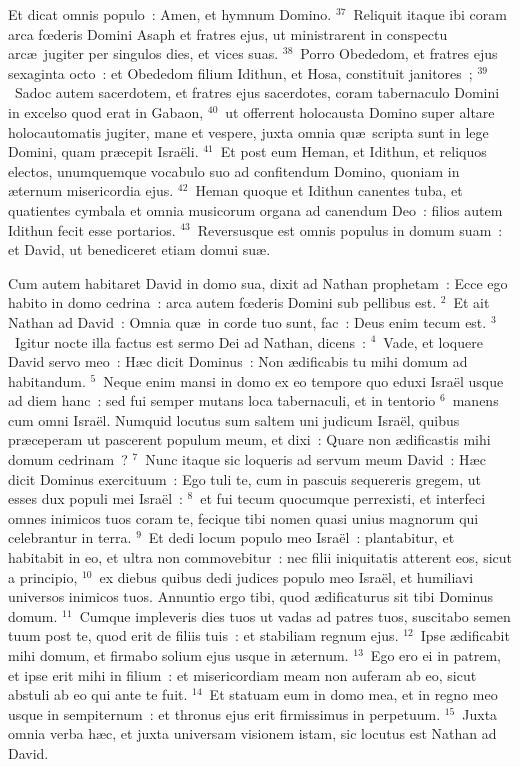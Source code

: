  Et dicat omnis populo~: Amen, et hymnum Domino.
${}^{37}$~Reliquit itaque ibi coram arca fœderis Domini Asaph et fratres ejus, ut ministrarent in conspectu arc\ae\ jugiter per singulos dies, et vices suas.
${}^{38}$~Porro Obededom, et fratres ejus sexaginta octo~: et Obededom filium Idithun, et Hosa, constituit janitores~;
${}^{39}$~Sadoc autem sacerdotem, et fratres ejus sacerdotes, coram tabernaculo Domini in excelso quod erat in Gabaon,
${}^{40}$~ut offerrent holocausta Domino super altare holocautomatis jugiter, mane et vespere, juxta omnia qu\ae\ scripta sunt in lege Domini, quam pr\ae cepit Isra\"eli.
${}^{41}$~Et post eum Heman, et Idithun, et reliquos electos, unumquemque vocabulo suo ad confitendum Domino, quoniam in \ae ternum misericordia ejus.
${}^{42}$~Heman quoque et Idithun canentes tuba, et quatientes cymbala et omnia musicorum organa ad canendum Deo~: filios autem Idithun fecit esse portarios.
${}^{43}$~Reversusque est omnis populus in domum suam~: et David, ut benediceret etiam domui su\ae .

\lettrine[lines=3,image=true,loversize=0.05,lraise=-0.03]{C}{}um autem habitaret David in domo sua, dixit ad Nathan prophetam~: Ecce ego habito in domo cedrina~: arca autem fœderis Domini sub pellibus est.
${}^{2}$~Et ait Nathan ad David~: Omnia qu\ae\ in corde tuo sunt, fac~: Deus enim tecum est.
${}^{3}$~Igitur nocte illa factus est sermo Dei ad Nathan, dicens~:
${}^{4}$~Vade, et loquere David servo meo~: H\ae c dicit Dominus~: Non \ae dificabis tu mihi domum ad habitandum.
${}^{5}$~Neque enim mansi in domo ex eo tempore quo eduxi Isra\"el usque ad diem hanc~: sed fui semper mutans loca tabernaculi, et in tentorio
${}^{6}$~manens cum omni Isra\"el. Numquid locutus sum saltem uni judicum Isra\"el, quibus pr\ae ceperam ut pascerent populum meum, et dixi~: Quare non \ae dificastis mihi domum cedrinam~?
${}^{7}$~Nunc itaque sic loqueris ad servum meum David~: H\ae c dicit Dominus exercituum~: Ego tuli te, cum in pascuis sequereris gregem, ut esses dux populi mei Isra\"el~:
${}^{8}$~et fui tecum quocumque perrexisti, et interfeci omnes inimicos tuos coram te, fecique tibi nomen quasi unius magnorum qui celebrantur in terra.
${}^{9}$~Et dedi locum populo meo Isra\"el~: plantabitur, et habitabit in eo, et ultra non commovebitur~: nec filii iniquitatis atterent eos, sicut a principio,
${}^{10}$~ex diebus quibus dedi judices populo meo Isra\"el, et humiliavi universos inimicos tuos. Annuntio ergo tibi, quod \ae dificaturus sit tibi Dominus domum.
${}^{11}$~Cumque impleveris dies tuos ut vadas ad patres tuos, suscitabo semen tuum post te, quod erit de filiis tuis~: et stabiliam regnum ejus.
${}^{12}$~Ipse \ae dificabit mihi domum, et firmabo solium ejus usque in \ae ternum.
${}^{13}$~Ego ero ei in patrem, et ipse erit mihi in filium~: et misericordiam meam non auferam ab eo, sicut abstuli ab eo qui ante te fuit.
${}^{14}$~Et statuam eum in domo mea, et in regno meo usque in sempiternum~: et thronus ejus erit firmissimus in perpetuum.
${}^{15}$~Juxta omnia verba h\ae c, et juxta universam visionem istam, sic locutus est Nathan ad David.


